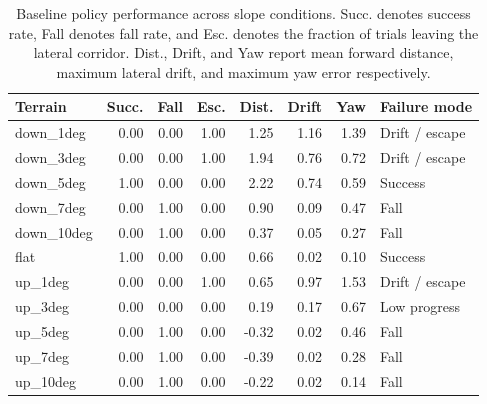 \begin{table}[h]
\centering
\small
\begin{tabular}{lrrrrrrl}
\hline
Terrain & Succ. & Fall & Esc. & Dist. & Drift & Yaw & Failure mode \\
\hline
down_1deg & 0.00 & 0.00 & 1.00 & 1.25 & 1.16 & 1.39 & Drift / escape \\
down_3deg & 0.00 & 0.00 & 1.00 & 1.94 & 0.76 & 0.72 & Drift / escape \\
down_5deg & 1.00 & 0.00 & 0.00 & 2.22 & 0.74 & 0.59 & Success \\
down_7deg & 0.00 & 1.00 & 0.00 & 0.90 & 0.09 & 0.47 & Fall \\
down_10deg & 0.00 & 1.00 & 0.00 & 0.37 & 0.05 & 0.27 & Fall \\
flat & 1.00 & 0.00 & 0.00 & 0.66 & 0.02 & 0.10 & Success \\
up_1deg & 0.00 & 0.00 & 1.00 & 0.65 & 0.97 & 1.53 & Drift / escape \\
up_3deg & 0.00 & 0.00 & 0.00 & 0.19 & 0.17 & 0.67 & Low progress \\
up_5deg & 0.00 & 1.00 & 0.00 & -0.32 & 0.02 & 0.46 & Fall \\
up_7deg & 0.00 & 1.00 & 0.00 & -0.39 & 0.02 & 0.28 & Fall \\
up_10deg & 0.00 & 1.00 & 0.00 & -0.22 & 0.02 & 0.14 & Fall \\
\hline
\end{tabular}
\caption{Baseline policy performance across slope conditions. Succ. denotes success rate, Fall denotes fall rate, and Esc. denotes the fraction of trials leaving the lateral corridor. Dist., Drift, and Yaw report mean forward distance, maximum lateral drift, and maximum yaw error respectively.}
\label{tab:baseline_slope_results}
\end{table}
